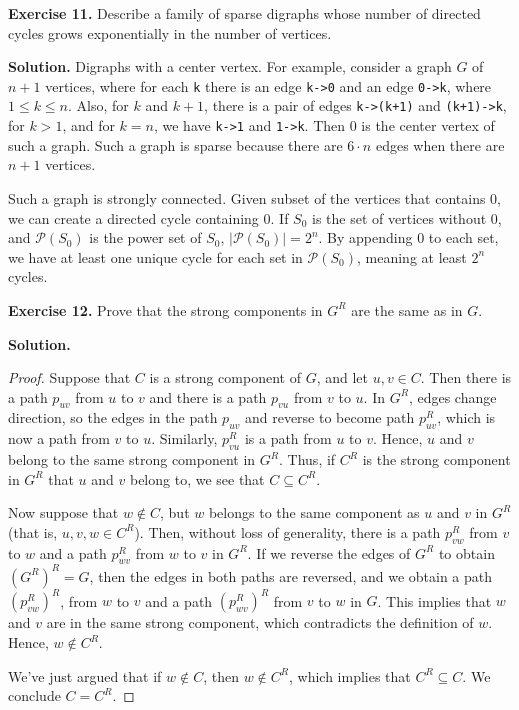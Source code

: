 \documentclass[12pt, a4paper]{article}
\newenvironment{ex}[2][Exercise]
{\par\medskip\noindent \textbf{#1 #2.}}
{\medskip}
\newenvironment{sol}[1][Solution]
{\par\medskip\noindent \textbf{#1.} }
{\medskip}
\begin{document}
	\begin{ex}{11}
		Describe a family of sparse digraphs whose number of directed cycles grows
		exponentially in the number of vertices.
	\end{ex}
	\begin{sol}
		Digraphs with a center vertex. For example, consider a graph $G$ of $n+1$
		vertices, where for each \texttt{k} there is an edge \texttt{k->0}
		and an edge \texttt{0->k}, where $1\leq k\leq n$. Also, for $k$ and
		$k+1$, there is a pair of edges \texttt{k->(k+1)} and \texttt{(k+1)->k},
		for $k>1$, and for $k=n$, we have \texttt{k->1} and \texttt{1->k}.
		Then $0$ is the center vertex of such a graph. Such a graph is sparse
		because there are $6\cdot n$ edges when there are $n+1$ vertices.
		
		Such a graph is strongly connected. Given subset of the vertices that contains
		$0$, we can create a directed cycle containing $0$. If $S_0$ is the set of
		vertices without $0$, and $\mathcal{P}(S_0)$ is the power set of $S_0$,
		$|\mathcal{P}(S_0)|=2^n$. By appending $0$ to each set, we have at least
		one unique cycle for each set in $\mathcal{P}(S_0)$, meaning at least $2^n$
		cycles.
	\end{sol}
	\begin{ex}{12}
		Prove that the strong components in $G^R$ are the same as in $G$.
	\end{ex}
	\begin{sol}
		\begin{proof}
			Suppose that $C$ is a strong component of $G$, and let $u,v\in C$.
			Then there is a path $p_{uv}$ from $u$ to $v$ and there is a path $p_{vu}$
			from $v$ to $u$. In $G^R$, edges change direction, so the edges in
			the path $p_{uv}$ and reverse to become path $p_{uv}^R$, which is
			now a path from $v$ to $u$. Similarly, $p_{vu}^R$ is a path from $u$
			to $v$. Hence, $u$ and $v$ belong to the same strong component in $G^R$.
			Thus, if $C^R$ is the strong component in $G^R$ that $u$ and $v$ belong
			to, we see that $C\subseteq C^R$.
			
			Now suppose that $w\notin C$, but $w$ belongs to the same component
			as $u$ and $v$ in $G^R$ (that is, $u,v,w\in C^R$). Then, without loss of
			generality, there is a path
			$p_{vw}^R$ from $v$ to $w$ and a path $p_{wv}^R$ from $w$ to $v$ in $G^R$.
			If we reverse the edges of $G^R$ to obtain $(G^R)^R=G$, then the edges
			in both paths are reversed, and we obtain a path $(p_{vw}^R)^R$, from $w$
			to $v$ and a path $(p_{wv}^R)^R$ from $v$ to $w$ in $G$. This implies that
			$w$ and $v$ are in the same strong component, which contradicts the definition
			of $w$. Hence, $w\notin C^R$.
			
			We've just argued that if $w\notin C$, then $w\notin C^R$, which implies that
			$C^R\subseteq C$. We conclude $C=C^R$.
		\end{proof}
	\end{sol}
\end{document}
